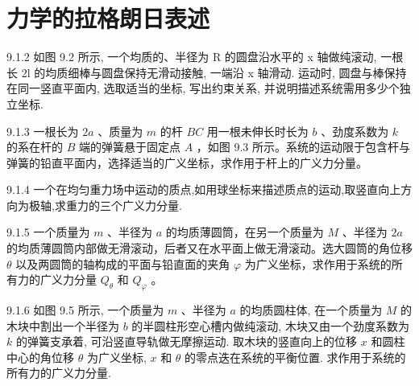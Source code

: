 \chapter{力学的拉格朗日表述}

\begin{problem}{9.1.2}
如图 9.2 所示, 一个均质的、半径为 R 的圆盘沿水平的 x 轴做纯滚动, 一根长 2l 的均质细棒与圆盘保持无滑动接触, 一端沿 x 轴滑动. 运动时, 圆盘与棒保持在同一竖直平面内, 选取适当的坐标, 写出约束关系, 并说明描述系统需用多少个独立坐标.
\begin{center}

\end{center}
\end{problem}
\clearpage


\begin{problem}{9.1.3}
一根长为 $2a$ 、质量为 $m$ 的杆 $BC$ 用一根未伸长时长为 $b$ 、劲度系数为 $k$ 的系在杆的 $B$ 端的弹簧悬于固定点 $A$ ，如图 9.3 所示。系统的运动限于包含杆与弹簧的铅直平面内，选择适当的广义坐标，求作用于杆上的广义力分量。
\begin{center}

\end{center}
\end{problem}
\clearpage


\begin{problem}{9.1.4}
一个在均匀重力场中运动的质点,如用球坐标来描述质点的运动,取竖直向上方向为极轴,求重力的三个广义力分量.
\end{problem}
\clearpage


\begin{problem}{9.1.5}
一个质量为 $m$ 、半径为 $a$ 的均质薄圆筒，在另一个质量为 $M$ 、半径为 $2a$ 的均质薄圆筒内部做无滑滚动，后者又在水平面上做无滑滚动。选大圆筒的角位移 $\theta$ 以及两圆筒的轴构成的平面与铅直面的夹角 $\varphi$ 为广义坐标，求作用于系统的所有力的广义力分量 $Q_{\theta}$ 和 $Q_{\varphi}$ 。
\end{problem}
\clearpage


\begin{problem}{9.1.6}
如图 9.5 所示, 一个质量为 $m$ 、半径为 $a$ 的均质圆柱体, 在一个质量为 $M$ 的木块中割出一个半径为 $b$ 的半圆柱形空心槽内做纯滚动, 木块又由一个劲度系数为 $k$ 的弹簧支承着, 可沿竖直导轨做无摩擦运动. 取木块的竖直向上的位移 $x$ 和圆柱中心的角位移 $\theta$ 为广义坐标, $x$ 和 $\theta$ 的零点迭在系统的平衡位置. 求作用于系统的所有力的广义力分量.
\begin{center}

\end{center}
\end{problem}
\clearpage


